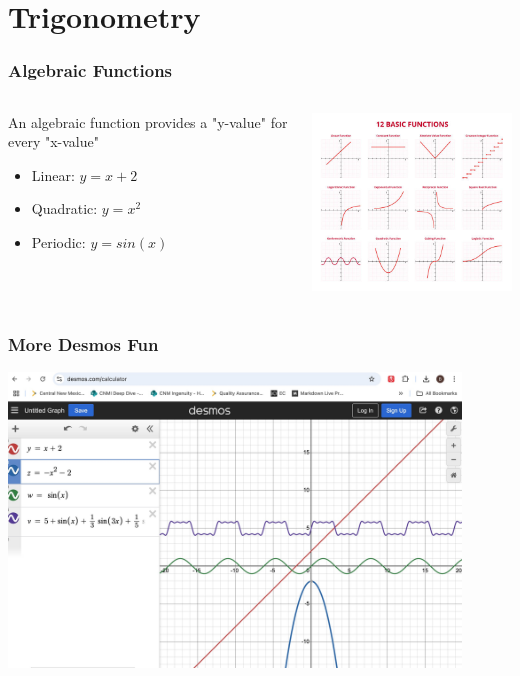 \documentclass{beamer}
\begin{document}
\section{Trigonometry}



\begin{frame}\frametitle{Algebraic Functions}
\begin{columns}
\begin{column}{4.5cm}
An algebraic function provides a "y-value" for every "x-value"
\begin{itemize}
\item Linear: $y = x + 2$
\item Quadratic: $y = x^2$
\item Periodic: $y = sin(x)$
\end{itemize}
\end{column}
\begin{column}{7cm}
\begin{center}
\includegraphics[width=7cm]{fig/basicfun.jpg}
\end{center}
\end{column}
\end{columns}
\end{frame}

\begin{frame}\frametitle{More Desmos Fun}

\begin{center}
\includegraphics[width=12cm]{fig/desmosfun.jpg}
\end{center}
\end{frame}
\end{document}
